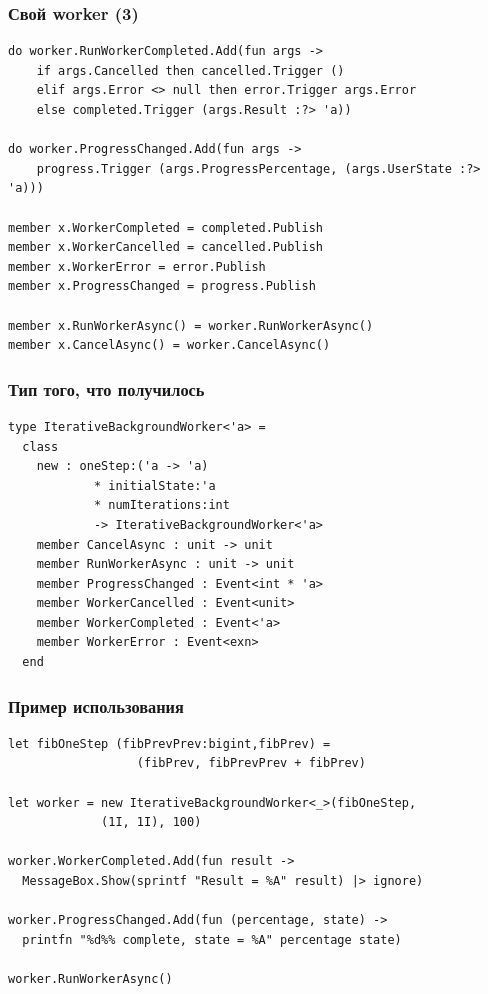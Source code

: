 \documentclass[xetex,mathserif,serif]{beamer}
\begin{document}
	\begin{frame}[fragile]
		\frametitle{Свой worker (3)}
		\begin{verbatim}
do worker.RunWorkerCompleted.Add(fun args ->
    if args.Cancelled then cancelled.Trigger ()
    elif args.Error <> null then error.Trigger args.Error
    else completed.Trigger (args.Result :?> 'a))

do worker.ProgressChanged.Add(fun args ->
    progress.Trigger (args.ProgressPercentage, (args.UserState :?> 'a)))

member x.WorkerCompleted = completed.Publish
member x.WorkerCancelled = cancelled.Publish
member x.WorkerError = error.Publish
member x.ProgressChanged = progress.Publish

member x.RunWorkerAsync() = worker.RunWorkerAsync()
member x.CancelAsync() = worker.CancelAsync()
		\end{verbatim}
	\end{frame}

	\begin{frame}[fragile]
		\frametitle{Тип того, что получилось}
		\begin{verbatim}
type IterativeBackgroundWorker<'a> =
  class
    new : oneStep:('a -> 'a) 
            * initialState:'a 
            * numIterations:int 
            -> IterativeBackgroundWorker<'a>
    member CancelAsync : unit -> unit
    member RunWorkerAsync : unit -> unit
    member ProgressChanged : Event<int * 'a>
    member WorkerCancelled : Event<unit>
    member WorkerCompleted : Event<'a>
    member WorkerError : Event<exn>
  end
		\end{verbatim}
	\end{frame}

	\begin{frame}[fragile]
		\frametitle{Пример использования}
		\begin{verbatim}
let fibOneStep (fibPrevPrev:bigint,fibPrev) = 
                  (fibPrev, fibPrevPrev + fibPrev)

let worker = new IterativeBackgroundWorker<_>(fibOneStep,
             (1I, 1I), 100)

worker.WorkerCompleted.Add(fun result ->
  MessageBox.Show(sprintf "Result = %A" result) |> ignore)

worker.ProgressChanged.Add(fun (percentage, state) ->
  printfn "%d%% complete, state = %A" percentage state)

worker.RunWorkerAsync()
		\end{verbatim}
	\end{frame}
\end{document}
